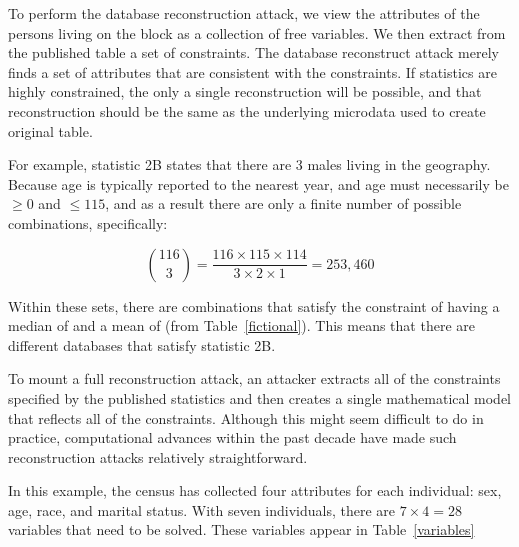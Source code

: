 \documentclass[runningheads]{llncs}
\begin{document}


To perform the database reconstruction attack, we view the attributes
of the persons living on the block as a collection of 
free variables. We then extract from the published table a set of
constraints. The database reconstruct attack merely finds a set of
attributes that are consistent with the constraints. If statistics are
highly constrained, the only a single reconstruction will be
possible, and that reconstruction should be the same as the underlying
microdata used to create original table.

For example, statistic 2B states that there are 3 males living in the
geography.  Because age is typically reported to the nearest year, and
age must necessarily be $\ge 0$ and $\le 115$, and as a result there
are only a finite number of possible combinations, specifically:

\[ \binom{116}{3}=\frac{116 \times 115 \times 114}{3 \times 2 \times
  1} = 253,460 \]

Within these sets, there are \mycount{} combinations that satisfy the
constraint of having a median of \mymedian{} and a mean of \mymean{}
(from Table~\ref{fictional}). This means that there are
\mycount{} different databases that satisfy statistic 2B.

To mount a full reconstruction attack, an attacker extracts all of the
constraints specified by the published statistics and then creates a
single mathematical model that reflects all of the
constraints. Although this might seem difficult to do in practice,
computational advances within the past decade have made such
reconstruction attacks relatively straightforward.

In this example, the census has collected four attributes for each
individual: sex, age, race, and marital status. With seven individuals,
there are $7\times 4 = 28$ variables that need to be solved. These
variables appear in Table~\ref{variables}
\end{document}
